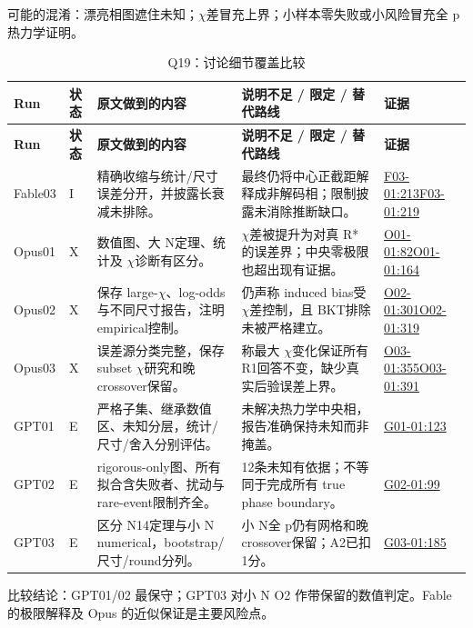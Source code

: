 \documentclass[11pt,a4paper]{article}
\begin{document}
可能的混淆：漂亮相图遮住未知；\ensuremath{\chi}差冒充上界；小样本零失败或小风险冒充全 p 热力学证明。

{\fontsize{9.0}{12.6}\selectfont
\setlength{\tabcolsep}{2.5pt}
\begin{longtable}{>{\raggedright\arraybackslash}p{}>{\raggedright\arraybackslash}p{}>{\raggedright\arraybackslash}p{}>{\raggedright\arraybackslash}p{}>{\raggedright\arraybackslash}p{}}
\caption{Q19：讨论细节覆盖比较}\\
\toprule
\textbf{Run} & \textbf{状态} & \textbf{原文做到的内容} & \textbf{说明不足 / 限定 / 替代路线} & \textbf{证据}\tabularnewline
\midrule
\endfirsthead
\toprule
\textbf{Run} & \textbf{状态} & \textbf{原文做到的内容} & \textbf{说明不足 / 限定 / 替代路线} & \textbf{证据}\tabularnewline
\midrule
\endhead
{}Fable03 & I & 精确收缩与统计/尺寸误差分开，并披露长衰减未排除。 & 最终仍将中心正截距解释成非解码相；限制披露未消除推断缺口。 & \hyperref[src:F03-01]{F03-01:213}\newline \hyperref[src:F03-01]{F03-01:219}\tabularnewline
{}Opus01 & X & 数值图、大 N定理、统计及 \ensuremath{\chi}诊断有区分。 & \ensuremath{\chi}差被提升为对真 R*的误差界；中央零极限也超出现有证据。 & \hyperref[src:O01-01]{O01-01:82}\newline \hyperref[src:O01-01]{O01-01:164}\tabularnewline
{}Opus02 & X & 保存 large-\ensuremath{\chi}、log-odds与不同尺寸报告，注明 empirical控制。 & 仍声称 induced bias受 \ensuremath{\chi}差控制，且 BKT排除未被严格建立。 & \hyperref[src:O02-01]{O02-01:301}\newline \hyperref[src:O02-01]{O02-01:319}\tabularnewline
{}Opus03 & X & 误差源分类完整，保存 subset \ensuremath{\chi}研究和晚 crossover保留。 & 称最大 \ensuremath{\chi}变化保证所有 R1回答不变，缺少真实后验误差上界。 & \hyperref[src:O03-01]{O03-01:355}\newline \hyperref[src:O03-01]{O03-01:391}\tabularnewline
{}GPT01 & E & 严格子集、继承数值区、未知分层，统计/尺寸/舍入分别评估。 & 未解决热力学中央相，报告准确保持未知而非掩盖。 & \hyperref[src:G01-01]{G01-01:123}\tabularnewline
{}GPT02 & E & rigorous-only图、所有拟合含失败者、扰动与 rare-event限制齐全。 & 12条未知有依据；不等同于完成所有 true phase boundary。 & \hyperref[src:G02-01]{G02-01:99}\tabularnewline
{}GPT03 & E & 区分 N14定理与小 N numerical，bootstrap/尺寸/round分列。 & 小 N全 p仍有网格和晚 crossover保留；A2已扣1分。 & \hyperref[src:G03-01]{G03-01:185}\tabularnewline
\bottomrule
\end{longtable}
}
比较结论：GPT01/02 最保守；GPT03 对小 N O2 作带保留的数值判定。Fable 的极限解释及 Opus 的近似保证是主要风险点。
\end{document}
